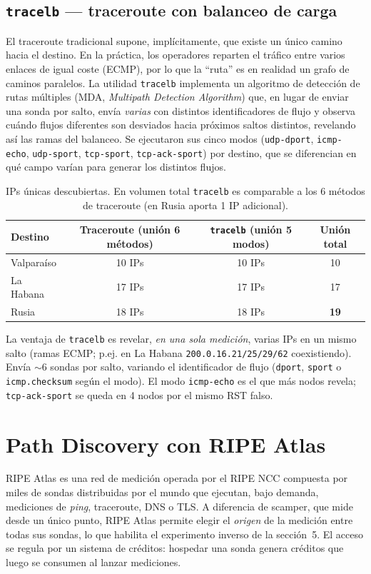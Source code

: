 \documentclass[11pt,a4paper]{article}
\newcommand{\ip}[1]{\texttt{#1}}
\begin{document}
\subsection{\texttt{tracelb} --- traceroute con balanceo de carga}
El traceroute tradicional supone, implícitamente, que existe un único camino hacia el destino. En
la práctica, los operadores reparten el tráfico entre varios enlaces de igual coste (ECMP), por
lo que la ``ruta'' es en realidad un grafo de caminos paralelos. La utilidad \texttt{tracelb}
implementa un algoritmo de detección de rutas múltiples (MDA, \emph{Multipath Detection
Algorithm}) que, en lugar de enviar una sonda por salto, envía \emph{varias} con distintos
identificadores de flujo y observa cuándo flujos diferentes son desviados hacia próximos saltos
distintos, revelando así las ramas del balanceo. Se ejecutaron sus cinco modos
(\texttt{udp-dport}, \texttt{icmp-echo}, \texttt{udp-sport}, \texttt{tcp-sport},
\texttt{tcp-ack-sport}) por destino, que se diferencian en qué campo varían para generar los
distintos flujos.

\begin{table}[H]
\centering\small
\begin{tabular}{lccc}
\toprule
Destino & Traceroute (unión 6 métodos) & \texttt{tracelb} (unión 5 modos) & Unión total \\
\midrule
Valparaíso & 10 IPs & 10 IPs & 10 \\
La Habana & 17 IPs & 17 IPs & 17 \\
Rusia & 18 IPs & 18 IPs & \textbf{19} \\
\bottomrule
\end{tabular}
\caption{IPs únicas descubiertas. En volumen total \texttt{tracelb} es comparable a los 6
métodos de traceroute (en Rusia aporta 1 IP adicional).}
\end{table}

\noindent La ventaja de \texttt{tracelb} es revelar, \emph{en una sola medición}, varias IPs en
un mismo salto (ramas ECMP; p.ej. en La Habana \ip{200.0.16.21/25/29/62} coexistiendo). Envía
$\sim$6 sondas por salto, variando el identificador de flujo (\texttt{dport}, \texttt{sport} o
\texttt{icmp.checksum} según el modo). El modo \texttt{icmp-echo} es el que más nodos revela;
\texttt{tcp-ack-sport} se queda en 4 nodos por el mismo RST falso.

\section{Path Discovery con RIPE Atlas}
RIPE Atlas es una red de medición operada por el RIPE NCC compuesta por miles de sondas
distribuidas por el mundo que ejecutan, bajo demanda, mediciones de \emph{ping}, traceroute, DNS
o TLS. A diferencia de scamper, que mide desde un único punto, RIPE Atlas permite elegir el
\emph{origen} de la medición entre todas sus sondas, lo que habilita el experimento inverso de la
sección~5. El acceso se regula por un sistema de créditos: hospedar una sonda genera créditos que
luego se consumen al lanzar mediciones.
\end{document}
